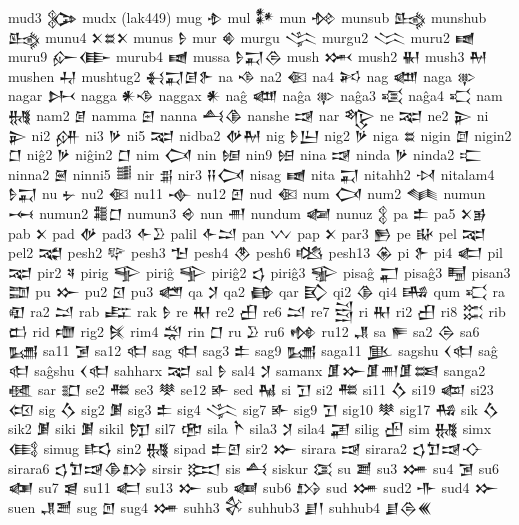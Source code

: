  mud3  𒉯   
 mudx  (lak449)   
 mug  𒈮   
 mul  𒀯   
 mun  𒁵   
 munsub  𒈰   
 munshub  𒈰   
 munu4  𒉽𒊺𒉽    
 munus  𒊩   
 mur  𒄯   
 murgu  𒋞   
 murgu2  𒈱   
 muru2  𒉠   
 muru9  𒅎𒂂    
 murub4  𒉠   
 mussa  𒊩𒍑𒁲    
 mush  𒈲   
 mush2  𒈽   
 mush3  𒈹   
 mushen  𒄷   
 mushtug2  𒈬𒍑𒌆𒉿    
 na  𒈾   
 na2  𒈿   
 na4  𒎎   
 nag  𒅘   
 naga  𒉀   
 nagar  𒉄   
 nagga  𒀭𒈾    
 naggax  𒀭   
 naĝ  𒅘   
 naĝa  𒉀   
 naĝa3  𒄤   
 naĝa4  𒄣   
 nam  𒉆   
 nam2  𒉇   
 namma  𒇉   
 nanna  𒋀𒆠    
 nanshe  𒀏   
 nar  𒈜   
 ne  𒉈   
 ne2  𒉌   
 ni  𒉌   
 ni2  𒉎   
 ni3  𒃻   
 ni5  𒉈   
 nidba2  𒉻𒈹    
 nig  𒊩𒌨    
 nig2  𒃻   
 niga  𒊺   
 nigin  𒇔   
 nigin2  𒆸   
 niĝ2  𒃻   
 niĝin2  𒆸   
 nim  𒉏   
 nin  𒎏   
 nin9  𒎐   
 nina  𒀏   
 ninda  𒃻   
 ninda2  𒉒   
 ninna2  𒇧   
 ninni5  𒌃   
 nir  𒉪   
 nir3  𒍝𒉏    
 nisag  𒉠   
 nita  𒍑   
 nitahh2  𒀴   
 nitalam4  𒊩𒍑    
 nu  𒉡   
 nu2  𒈿   
 nu11  𒉢   
 nu12  𒇻   
 nud  𒈿   
 num  𒉏   
 num2  𒈝   
 numun  𒆰   
 numun2  𒍤𒆸    
 numun3  𒄴   
 nun  𒉣   
 nundum  𒅻   
 nunuz  𒉭   
 pa  𒉺   
 pa5  𒉽𒂊    
 pab  𒉽   
 pad  𒉻   
 pad3  𒅆𒊒    
 palil  𒅆𒁺    
 pan  𒉼   
 pap  𒉽   
 par3  𒁖   
 pe  𒄫   
 pel  𒉈   
 pel2  𒉋   
 pesh2  𒉾   
 pesh3  𒈠   
 pesh4  𒊯   
 pesh6  𒆓   
 pesh13  𒊴   
 pi  𒉿   
 pi4  𒅗   
 pil  𒉈   
 pir2  𒎕   
 pirig  𒊊   
 piriĝ  𒊊   
 piriĝ2  𒌓   
 piriĝ3  𒊌   
 pisaĝ  𒂷   
 pisaĝ3  𒋄   
 pisan3  𒊿   
 pu  𒁍   
 pu2  𒇥   
 pu3  𒅤   
 qa  𒋡   
 qa2  𒂵   
 qar  𒃼   
 qi2  𒆠   
 qi4  𒄄   
 qum  𒄣   
 ra  𒊏   
 ra2  𒁺   
 rab  𒊐   
 rak  𒊩   
 re  𒊑   
 re2  𒌷   
 re6  𒁺   
 re7  𒁻   
 ri  𒊑   
 ri2  𒌷   
 ri8  𒈶   
 rib  𒆗   
 rid  𒈩   
 rig2  𒍮   
 rim4  𒁽   
 rin  𒆸   
 ru  𒊒   
 ru6  𒂔   
 ru12  𒂗   
 sa  𒊓   
 sa2  𒁲   
 sa6  𒊷   
 sa11  𒋜   
 sa12  𒊕   
 sag  𒊕   
 sag3  𒉺   
 sag9  𒊷   
 saga11  𒆥   
 sagshu  𒌋𒊕    
 saĝ  𒊕   
 saĝshu  𒌋𒊕    
 sahharx  𒉈   
 sal  𒊩   
 sal4  𒋡   
 samanx  𒂠𒁍𒂠𒉣𒂠𒌅    
 sanga2  𒊫   
 sar  𒊬   
 se2  𒍣   
 se3  𒋧   
 se12  𒅊   
 sed  𒈻   
 si  𒋛   
 si2  𒍣   
 si11  𒋝   
 si19  𒆉   
 si23  𒄢   
 sig  𒋝   
 sig2  𒋠   
 sig3  𒉺   
 sig4  𒋞   
 sig7  𒅊   
 sig9  𒋛   
 sig10  𒋧   
 sig17  𒄀   
 sik  𒋝   
 sik2  𒋠   
 siki  𒋠   
 sikil  𒂖   
 sil7  𒂣   
 sila  𒋻   
 sila3  𒋡   
 sila4  𒃢   
 silig  𒍂   
 sim  𒉆   
 simx  𒍼   
 simug  𒌣   
 sin2  𒉆   
 sipad  𒉺𒇻    
 sir2  𒁍   
 sirara  𒀏   
 sirara2  𒌓𒈣𒀏𒋓    
 sirara6  𒌓𒈣𒀏𒆠𒋳    
 sirsir  𒁎   
 sis  𒋀   
 siskur  𒀬   
 su  𒋢   
 su3  𒋤   
 su4  𒋜   
 su6  𒅾   
 su7  𒇭   
 su11  𒅗   
 su13  𒁍   
 sub  𒅢   
 sub6  𒋳   
 sud  𒋤   
 sud2  𒋥   
 sud4  𒁍   
 suen  𒂗𒍪    
 sug  𒆹   
 sug4  𒋤   
 suhh3  𒄗   
 suhhub3  𒋗𒁹    
 suhhub4  𒋗𒁲𒌍    
